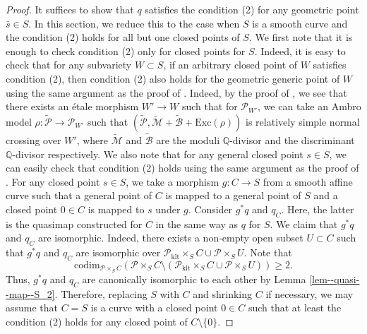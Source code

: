 \documentclass[12pt,twoside]{amsart}
\theoremstyle{definition}
\begin{document}
\begin{proof}
 It suffices to show that $q$ satisfies the condition (2) for any geometric point $\bar{s}\in S$.
 In this section, we reduce this to the case when $S$ is a smooth curve and the condition (2) holds for all but one closed points of $S$.
We first note that it is enough to check condition (2) only for closed points for $S$.
Indeed, it is easy to check that for any subvariety $W\subset S$, if an arbitrary closed point of $W$ satisfies condition (2), then condition (2) also holds for the geometric generic point of $W$ using the same argument as the proof of \cite[Lemma 4.1]{HH}. 
Indeed, by the proof of \cite[Lemma 4.1]{HH}, we see that there exists an \'etale morphism $W'\to W$ such that for  $\mathcal{P}_{W'}$, we can take an Ambro model $\rho\colon\widetilde{\mathcal{P}}\to \mathcal{P}_{W'}$ such that $(\widetilde{\mathcal{P}},\widetilde{\mathcal{M}}+\widetilde{\mathcal{B}}+\mathrm{Exc}(\rho))$ is relatively simple normal crossing over $W'$, where $\widetilde{\mathcal{M}}$ and $\widetilde{\mathcal{B}}$ are the moduli $\mathbb{Q}$-divisor and the discriminant $\mathbb{Q}$-divisor respectively.
We also note that for any general closed point $s\in S$, we can easily check that condition (2) holds using the same argument as the proof of \cite[Lemma 4.1]{HH}.
For any closed point $s\in S$,  we take a morphism $g\colon C\to S$ from a smooth affine curve such that a general point of $C$ is mapped to a general point of $S$ and a closed point $0\in C$ is mapped to $s$ under $g$.
Consider $g^*q$ and $q_C$.
Here, the latter is the quasimap constructed for $C$ in the same way as $q$ for $S$.
We claim that $g^*q$ and $q_C$ are isomorphic.
Indeed, there exists a non-empty open subset $U\subset C$ such that $g^*q$ and $q_C$ are isomorphic over $\mathcal{P}_{\mathrm{klt}}\times_SC\cup \mathcal{P}\times_SU$.
Note that $$\mathrm{codim}_{\mathcal{P}\times_SC}(\mathcal{P}\times_SC\setminus(\mathcal{P}_{\mathrm{klt}}\times_SC\cup \mathcal{P}\times_SU))\ge2.$$ 
Thus, $g^*q$ and $q_C$ are canonically isomorphic to each other by Lemma \ref{lem--quasi--map--S_2}.
Therefore, replacing $S$ with $C$ and shrinking $C$ if necessary, we may assume that $C=S$ is a curve with a closed point $0\in C$ such that at least the condition (2) holds for any closed point of $C\setminus\{0\}$.


\end{proof}
\end{document}
